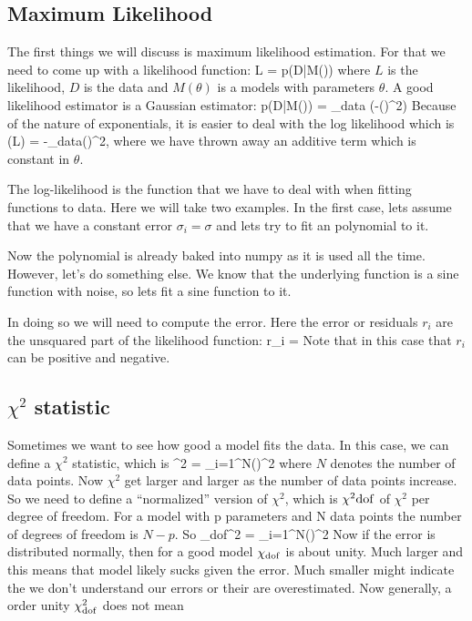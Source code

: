 \subsection{Maximum Likelihood}

The first things we will discuss is maximum likelihood estimation.  For that we need to come up with a likelihood function:
\be
L = p(D|M(\theta))
\ee
where $L$ is the likelihood, $D$ is the data and $M(\theta)$ is a models with parameters $\theta$.  A good likelihood estimator is a Gaussian estimator:
\be
p(D|M(\theta)) = \prod_{\rm data} \exp\left(-\left(\right)^2\right)
\ee
Because of the nature of exponentials, it is easier to deal with the log likelihood which is 
\be
\log(L) = -\sum_{\rm data}\left(\right)^2,
\ee
where we have thrown away an additive term which is constant in $\theta$.  

The log-likelihood is the function that we have to deal with when fitting functions to data.  Here we will take two examples.  In the first case, lets assume that we have a constant error $\sigma_i=\sigma$ and lets try to fit an polynomial to it. 

Now the polynomial is already baked into numpy as it is used all the time.  However, let's do something else.  We know that the underlying function is a sine function with noise, so lets fit a sine function to it. 

In doing so we will need to compute the error.  Here the error or residuals $r_i$ are the unsquared part of the likelihood function:
\be
r_i = 
\ee
Note that in this case that $r_i$ can be positive and negative.  

\subsection{$\chi^2$ statistic}

Sometimes we want to see how good a model fits the data.  In this case, we can define a $\chi^2$ statistic, which is 
\be
\chi^2 = \sum_{i=1}^N\left(\right)^2
\ee
where $N$ denotes the number of data points.  Now $\chi^2$ get larger and larger as the number of data points increase.  So we need to define a ``normalized'' version of $\chi^2$, which is $\chi^2{\rm dof}$ of $\chi^2$ per degree of freedom.  For a model with p parameters and N data points the number of degrees of freedom is $N-p$. So
\be
\chi_{\rm dof}^2 = \sum_{i=1}^N\left(\right)^2
\ee
Now if the error is distributed normally, then for a good model $\chi_{\rm dof}$ is about unity.  Much larger and this means that model likely sucks given the error.  Much smaller might indicate the we don't understand our errors or their are overestimated.  Now generally, a order unity $\chi_{\rm dof}^2$ does not mean 

